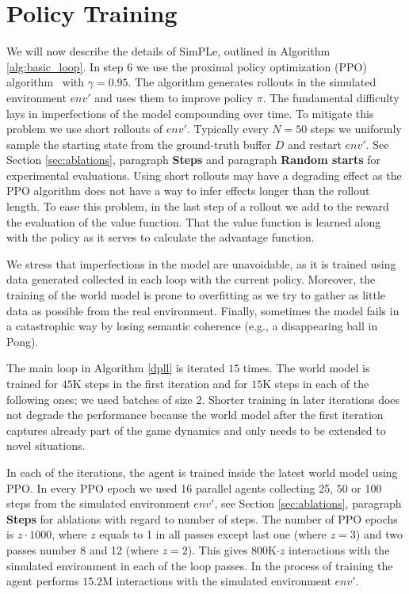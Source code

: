 \section{Policy Training} \label{sec:policy_training}
We will now describe the details of SimPLe, outlined in Algorithm \ref{alg:basic_loop}.  In step 6 we use the proximal policy optimization (PPO) algorithm~\cite{ppo} with $\gamma=0.95$. The algorithm generates rollouts in the simulated environment $env'$ and uses them to improve policy $\pi$. The fundamental difficulty lays in imperfections of the model compounding over time. To mitigate this problem we use short rollouts of $env'$. Typically every $N=50$ steps we uniformly sample the starting state from the ground-truth buffer $D$ and restart $env'$. See Section \ref{sec:ablations}, paragraph {\bf Steps} and paragraph {\bf Random starts} for experimental evaluations. Using short rollouts may have a degrading effect as the PPO algorithm does not have a way to infer effects longer than the rollout length. To ease this problem, in the last step of a rollout we add to the reward the evaluation of the value function. That the value function is learned along with the policy as it serves to calculate the advantage function.

We stress that imperfections in the model are unavoidable, as it is trained using data generated collected in each loop with the current policy. Moreover, the training of the world model is prone to overfitting as we try to gather as little data as possible from the real environment. Finally, sometimes the model fails in a catastrophic way by losing semantic coherence (e.g., a disappearing ball in Pong).

The main loop in Algorithm \ref{dpll} is iterated $15$ times. The world model is trained for $45$K steps in the first iteration and for $15$K steps in each of the following ones; we used batches of size $2$. Shorter training in later iterations does not degrade the performance because the world model after the first iteration captures already part of the game dynamics and only needs to be extended to novel situations.

In each of the iterations, the agent is trained inside the latest world model using PPO. In every PPO epoch we used 16 parallel agents collecting 25, 50 or 100 steps from the simulated environment $env'$, see Section \ref{sec:ablations}, paragraph {\bf Steps} for ablations with regard to number of steps. The number of PPO epochs is $z\cdot 1000$, where $z$ equals to 1 in all passes except last one (where $z = 3$) and two passes number 8 and 12 (where $z = 2$). This gives $800$K$\cdot z$ interactions with the simulated environment in each of the loop passes. In the process of training the agent performs  $15.2$M interactions with the simulated environment $env'$.
